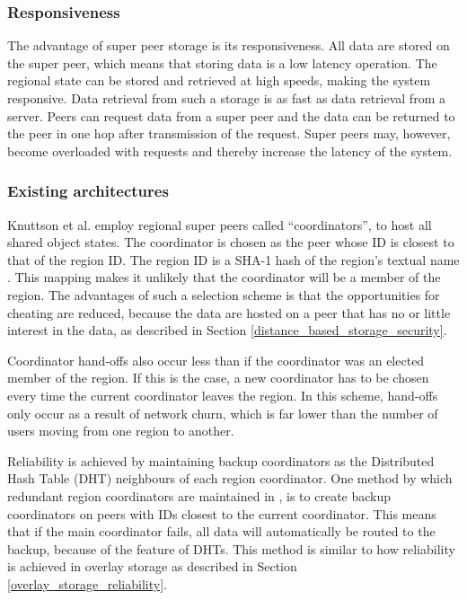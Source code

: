 \subsubsection{Responsiveness}
The advantage of super peer storage is its responsiveness. All data are stored on the super peer, which means that storing data is a low latency operation. The regional state can be stored and retrieved at high speeds, making the system responsive. Data retrieval from such a storage is as fast as data retrieval from a server. Peers can request data from a super peer and the data can be returned to the peer in one hop after transmission of the request. Super peers may, however, become overloaded with requests and thereby increase the latency of the system.

\subsubsection{Existing architectures}
\label{super_peer_storage_rel_arhcs}

Knuttson et al. \cite{knutsson_p2p_first} employ regional super peers called ``coordinators'', to host all shared object states. The coordinator is chosen as the peer whose ID is closest to that of the region ID. The region ID is a SHA-1 hash of the region's textual name \cite{SHA}. This mapping makes it unlikely that the coordinator will be a member of the region. The advantages of such a selection scheme is that the opportunities for cheating are reduced, because the data are hosted on a peer that has no or little interest in the data, as described in Section
\ref{distance_based_storage_security}.

Coordinator hand-offs also occur less than if the coordinator was an elected member of the region. If this is the case, a new coordinator has to be chosen every time the current coordinator leaves the region. In this scheme, hand-offs only occur as a result of network churn, which is far lower than the number of users moving from one region to another.

Reliability is achieved by maintaining backup coordinators as the Distributed Hash Table (DHT) neighbours of each region coordinator. One method by which redundant region coordinators are maintained in \cite{knutsson_p2p_first}, is to create backup coordinators on peers with IDs closest to the current coordinator. This means that if the main coordinator fails, all data will automatically be routed to the backup, because of the feature of DHTs. This method is similar to how reliability is achieved in overlay storage as described in Section \ref{overlay_storage_reliability}.

